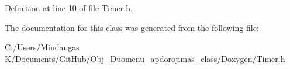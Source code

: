 Definition at line 10 of file Timer.\+h.



The documentation for this class was generated from the following file\+:\begin{DoxyCompactItemize}
\item 
C\+:/\+Users/\+Mindaugas K/\+Documents/\+Git\+Hub/\+Obj\+\_\+\+Duomenu\+\_\+apdorojimas\+\_\+class/\+Doxygen/\mbox{\hyperlink{_timer_8h}{Timer.\+h}}\end{DoxyCompactItemize}
